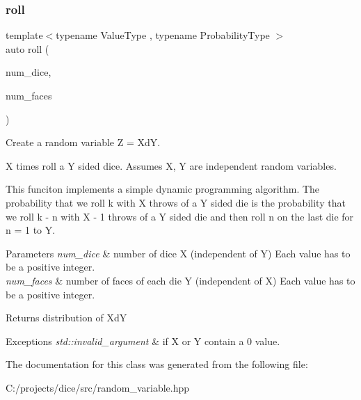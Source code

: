 \subsubsection{\texorpdfstring{roll}{roll}}
{\footnotesize\ttfamily template$<$typename Value\+Type , typename Probability\+Type $>$ \\
auto roll (\begin{DoxyParamCaption}\item[{const \mbox{\hyperlink{classdice_1_1random__variable}{random\+\_\+variable}}$<$ Value\+Type, Probability\+Type $>$ \&}]{num\+\_\+dice,  }\item[{const \mbox{\hyperlink{classdice_1_1random__variable}{random\+\_\+variable}}$<$ Value\+Type, Probability\+Type $>$ \&}]{num\+\_\+faces }\end{DoxyParamCaption})\hspace{0.3cm}{\ttfamily [friend]}}



Create a random variable Z = XdY. 

X times roll a Y sided dice. Assumes X, Y are independent random variables.

This funciton implements a simple dynamic programming algorithm. The probability that we roll k with X throws of a Y sided die is the probability that we roll k -\/ n with X -\/ 1 throws of a Y sided die and then roll n on the last die for n = 1 to Y.


\begin{DoxyParams}{Parameters}
{\em num\+\_\+dice} & number of dice X (independent of Y) Each value has to be a positive integer. \\
\hline
{\em num\+\_\+faces} & number of faces of each die Y (independent of X) Each value has to be a positive integer.\\
\hline
\end{DoxyParams}
\begin{DoxyReturn}{Returns}
distribution of XdY
\end{DoxyReturn}

\begin{DoxyExceptions}{Exceptions}
{\em std\+::invalid\+\_\+argument} & if X or Y contain a 0 value. \\
\hline
\end{DoxyExceptions}


The documentation for this class was generated from the following file\+:\begin{DoxyCompactItemize}
\item 
C\+:/projects/dice/src/random\+\_\+variable.\+hpp\end{DoxyCompactItemize}
